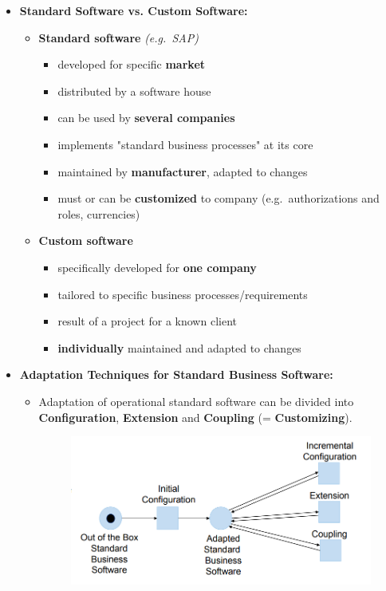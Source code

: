 \documentclass[ieeetran]{article}
\begin{document}
\begin{itemize}
  \item \textbf{Standard Software vs. Custom Software:}
	  \begin{itemize}
	    \item \textbf{Standard software} \textit{(e.g.\ SAP)}
		    \begin{itemize}
		      \item developed for specific \textbf{market}
		\item distributed by a software house
			\item can be used by \textbf{several companies}
			\item implements "standard business processes" at its core
			\item maintained by \textbf{manufacturer}, adapted to changes
			\item must or can be \textbf{customized} to company (e.g.\ authorizations and roles, currencies) 
		    \end{itemize}
	\item \textbf{Custom software}
		\begin{itemize}
		  \item specifically developed for \textbf{one company}
	\item tailored to specific business processes/requirements
		\item result of a project for a known client
			\item \textbf{individually} maintained and adapted to changes
		\end{itemize}
	  \end{itemize}
\pagebreak
\item \textbf{Adaptation Techniques for Standard Business Software:}
	\begin{itemize}
		\item Adaptation of operational standard software can be divided into \textbf{Configuration}, \textbf{Extension} and \textbf{Coupling} (= \textbf{Customizing}).
               \begin{figure}[h!]
                 \centering
                 \includegraphics[width=0.5\linewidth]{adaptationsbs.png}
                 \label{fig:adaptationsbs_png}
               \end{figure} 


\end{itemize}
\end{itemize}
\end{document}
